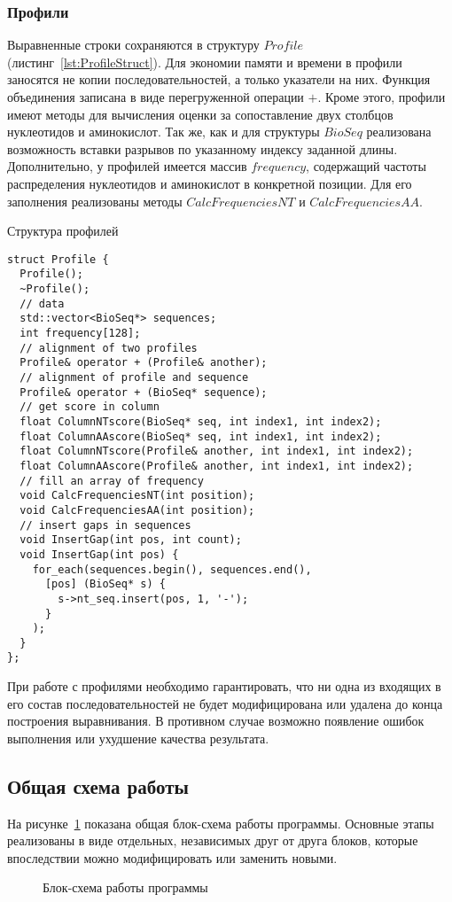 \subsubsection[Профили]{\large Профили}
\hspace{\parindent} Выравненные строки сохраняются в структуру $Profile$ (листинг~\ref{lst:ProfileStruct}). Для экономии памяти и времени в профили заносятся не копии последовательностей, а только указатели на них. Функция объединения записана в виде перегруженной операции $+$. Кроме этого, профили имеют методы для вычисления оценки за сопоставление двух столбцов нуклеотидов и аминокислот. Так же, как и для структуры $BioSeq$ реализована возможность вставки разрывов по указанному индексу заданной длины. Дополнительно, у профилей имеется массив $frequency$, содержащий частоты распределения нуклеотидов и аминокислот в конкретной позиции. Для его заполнения реализованы методы $CalcFrequenciesNT$ и $CalcFrequenciesAA$.\\
\begin{algorithm}
	\caption{Структура профилей} \label{lst:ProfileStruct}
	\begin{lstlisting}
struct Profile {
  Profile();
  ~Profile();
  // data
  std::vector<BioSeq*> sequences;
  int frequency[128];
  // alignment of two profiles
  Profile& operator + (Profile& another);
  // alignment of profile and sequence
  Profile& operator + (BioSeq* sequence);
  // get score in column
  float ColumnNTscore(BioSeq* seq, int index1, int index2);
  float ColumnAAscore(BioSeq* seq, int index1, int index2);
  float ColumnNTscore(Profile& another, int index1, int index2);
  float ColumnAAscore(Profile& another, int index1, int index2);
  // fill an array of frequency
  void CalcFrequenciesNT(int position);
  void CalcFrequenciesAA(int position);
  // insert gaps in sequences
  void InsertGap(int pos, int count);
  void InsertGap(int pos) {
    for_each(sequences.begin(), sequences.end(), 
      [pos] (BioSeq* s) {
        s->nt_seq.insert(pos, 1, '-');
      }
    );
  }
};
	\end{lstlisting}
\end{algorithm}


\indent При работе с профилями необходимо гарантировать, что ни одна из входящих в его состав последовательностей не будет модифицирована или удалена до конца построения выравнивания. В противном случае возможно появление ошибок выполнения или ухудшение качества результата. 

\subsection[Общая схема работы]{\large Общая схема работы}
\hspace{\parindent} На рисунке~\ref{ris:scheme} показана общая блок-схема работы программы. Основные этапы реализованы в виде отдельных, независимых друг от друга блоков, которые впоследствии можно модифицировать или заменить новыми. 
\begin{figure}[H]
	\caption{Блок-схема работы программы}
	\label{ris:scheme}
\end{figure}

